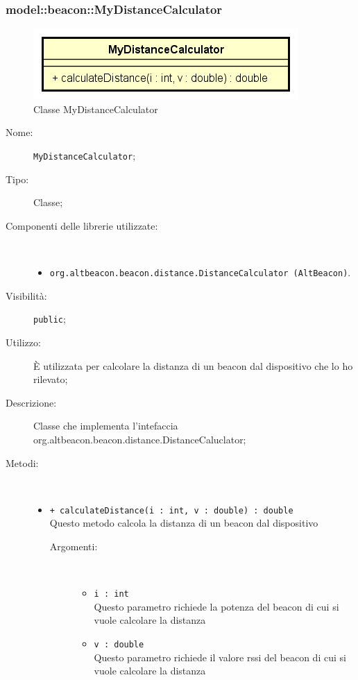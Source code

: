 \documentclass[../DefinizioneDiProdotto.tex]{subfiles}
\begin{document}
\subsubsection{model::beacon::MyDistanceCalculator}

    \begin{figure}[H]
        \centering
        \includegraphics{img/MyDistanceCalculator.png}
        \caption{Classe MyDistanceCalculator}\label{fig:model::beacon::MyDistanceCalculator} 
    \end{figure}
    \begin{description}
\item[Nome:] \texttt{MyDistanceCalculator};
\item[Tipo:] Classe;
\item[Componenti delle librerie utilizzate:] \
\begin{itemize}
\item \texttt{org.altbeacon.beacon.distance.DistanceCalculator (AltBeacon)}.

\end{itemize}
\item[Visibilità:] \texttt{public};
\item[Utilizzo:] È utilizzata per calcolare la distanza di un beacon dal dispositivo che lo ho rilevato;
\item[Descrizione:] Classe che implementa l'intefaccia org.altbeacon.beacon.distance.DistanceCaluclator;
\item[Metodi:] \
\begin{itemize}
\item \texttt{+ calculateDistance(i : int, v : double) : double}\\
Questo metodo calcola la distanza di un beacon dal dispositivo
 \begin{description}
\item[Argomenti:] \
\begin{itemize}
\item \texttt{i : int}\\
Questo parametro richiede la potenza del beacon di cui si vuole calcolare la distanza\item \texttt{v : double}\\
Questo parametro richiede il valore rssi del beacon di cui si vuole calcolare la distanza\end{itemize}
\end{description}
\end{itemize}
\end{description}
\end{document}
